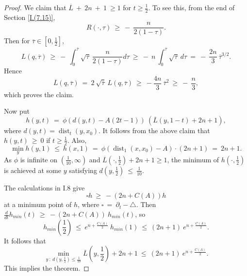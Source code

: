 \documentclass[12pt]{amsart}
\newcommand{\dist}{\operatorname{dist}}
\numberwithin{equation}{section}
\theoremstyle{plain}
\theoremstyle{definition}
\theoremstyle{remark}
\begin{document}
\begin{proof}
We claim that $\overline{L} \: + \: 2n \: + \: 1 \: \ge 1$ for
$t \ge \frac12$. To see this, from the end of Section \ref{I.(7.15)},
\begin{equation}
R(\cdot, \tau) \: \ge \: - \: \frac{n}{2(1-\tau)}.
\end{equation}
Then for $\overline{\tau} \in [0, \frac12]$,
\begin{equation}
L(q, \overline{\tau}) \: \ge \: - \: 
\int_0^{\overline{\tau}} \sqrt{\tau} \: \frac{n}{2(1-\tau)}
d\tau \: \ge \: - \: n \:
\int_0^{\overline{\tau}} \sqrt{\tau} \:
d\tau \: = \: - \: \frac{2n}{3} \:
{\overline{\tau}}^{3/2}.
\end{equation}
Hence
\begin{equation}
\overline{L}(q, \overline{\tau}) \: = \: 2 \: \sqrt{\overline{\tau}} \:
L(q, \overline{\tau}) \: \ge \: - \frac{4n}{3} \: 
\overline{\tau}^2 \: \ge \:
- \: \frac{n}{3},
\end{equation}
which proves the claim.

Now put
\begin{equation}
h(y,t) \: = \: \phi(d(y,t) - A(2t-1)) \:
(\overline{L}(y,1-t) +2n+1),
\end{equation}
where $d(y,t) = \dist_t(y,x_0)$. 
It follows from the above claim that $h(y,t) \: \ge \: 0$
if $t \ge \frac12$.
Also,
\begin{equation}
\min_y h(y,1) \: \le \: h(x,1) \: = \: 
\phi(\dist_1(x,x_0) - A) \cdot (2n+1) \: = \: 2n+1.
\end{equation}
As $\phi$ is infinite on $(\frac{1}{10}, \infty)$ and
$\overline{L}(\cdot, \frac12) +2n+1 \ge 1$, the
minimum of $h(\cdot, \frac12)$ is achieved at some
$y$ satisfying $d(y,\frac12) \: \le \: \frac{1}{10}$.

The calculations in I.8 give
\begin{equation}
\square h \: \ge \: -(2n+C(A)) h
\end{equation}
at a minimum point of $h$,
where $\square \: = \: \partial_t - \triangle$. 
Then $\frac{d}{dt} h_{min}(t) \: \ge \: -(2n+C(A)) \: h_{min}(t)$,
so 
\begin{equation}
h_{min} \left( \frac12 \right) 
\: \le \: e^{n+\frac{C(A)}{2}} \: h_{min}(1) 
\: \le \: (2n+1) \: e^{n+\frac{C(A)}{2}}.
\end{equation}
It follows that 
\begin{equation}
\min_{y \: : \: d(y, \frac12) \le \frac{1}{10}} 
\overline{L}(y, \frac12) +2n+1 \: \le 
\: (2n+1) \: e^{n+\frac{C(A)}{2}}.
\end{equation}
This implies the theorem.
\end{proof}
\end{document}
